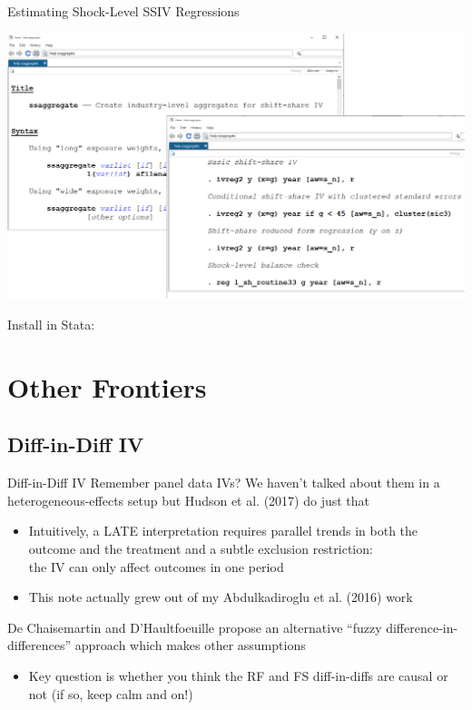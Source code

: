 \documentclass{beamer}
\begin{document}
\begin{frame}{Estimating Shock-Level SSIV Regressions}
\vspace{-0.3cm}
\begin{center}
\includegraphics[scale=0.27]{./lecture_includes/ssaggregate.png}
\end{center}
Install in Stata: 
\end{frame}

\section{Other Frontiers}

\subsection{Diff-in-Diff IV}
\begin{frame}{Diff-in-Diff IV}
Remember panel data IVs? We haven't talked about them in a heterogeneous-effects setup but Hudson et al. (2017) do just that\smallskip
\begin{itemize}
\item Intuitively, a LATE interpretation requires parallel trends in both the outcome and the treatment and a subtle exclusion restriction: \\ the IV can only affect outcomes in one period \smallskip
\item This note actually grew out of my Abdulkadiroglu et al. (2016) work
\end{itemize}\bigskip\pause{}

De Chaisemartin and D'Haultfoeuille propose an alternative ``fuzzy difference-in-differences'' approach which makes other assumptions\smallskip
\begin{itemize}
\item Key question is whether you think the RF and FS diff-in-diffs are causal or not (if so, keep calm and  on!)
\end{itemize}

\end{frame}
\end{document}
